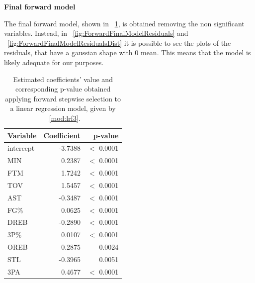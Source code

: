 \vspace{0.2cm}
\noindent
\textbf{Final forward model}

The final forward model, shown in \Tab~\ref{table:ForwardFinalModelSummary}, is obtained removing the non significant variables. Instead, in \Fig~\ref{fig:ForwardFinalModelResiduals} and \Fig~\ref{fig:ForwardFinalModelResidualsDist} it is possible to see the plots of the residuals, that have a gaussian shape with 0 mean. This means that the model is likely adequate for our purposes.

\begin{center}
\end{center}
\begin{table}[H]
	\centering
	\begin{tabular}{|| l | r | r ||} 
		\hline
		Variable & Coefficient & p-value \\
		\hline
		intercept & -3.7388 & $<$ 0.0001 \\
		MIN & 0.2387 & $<$ 0.0001 \\
		FTM & 1.7242 & $<$ 0.0001 \\
		TOV & 1.5457 & $<$ 0.0001 \\
		AST & -0.3487 & $<$ 0.0001 \\
		FG\% & 0.0625 & $<$ 0.0001 \\
		DREB & -0.2890 & $<$ 0.0001 \\
		3P\% & 0.0107 & $<$ 0.0001 \\
		OREB & 0.2875 & 0.0024 \\
		STL & -0.3965 & 0.0051 \\
		3PA & 0.4677 & $<$ 0.0001 \\
		\hline
	\end{tabular}
	\caption{Estimated coefficients' value and corresponding p-value obtained applying forward stepwise selection to a linear regression model, given by \Mod~\ref{mod:lrf3}.}
	\label{table:ForwardFinalModelSummary}
\end{table}

